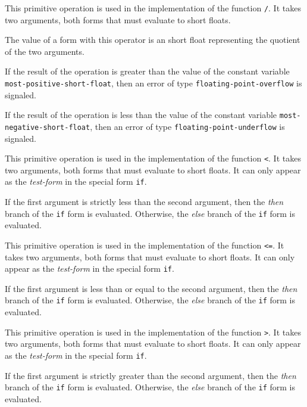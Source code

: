 
This primitive operation is used in the implementation of the
\commonlisp{} function \texttt{/}.  It takes two arguments, both forms
that must evaluate to short floats.

The value of a form with this operator is an short float
representing the quotient of the two arguments.

If the result of the operation is greater than the value of the
constant variable \texttt{most-positive-short-float}, then an error of
type \texttt{floating-point-overflow} is signaled.

If the result of the operation is less than the value of the constant
variable \texttt{most-negative-short-float}, then an error of type
\texttt{floating-point-underflow} is signaled.


This primitive operation is used in the implementation of the
\commonlisp{} function \texttt{<}.  It takes two arguments, both forms
that must evaluate to short floats.  It can only appear as the
\emph{test-form} in the special form \texttt{if}.

If the first argument is strictly less than the second argument, then
the \emph{then} branch of the \texttt{if} form is evaluated.
Otherwise, the \emph{else} branch of the \texttt{if} form is
evaluated.


This primitive operation is used in the implementation of the
\commonlisp{} function \texttt{<=}.  It takes two arguments, both forms
that must evaluate to short floats.  It can only appear as the
\emph{test-form} in the special form \texttt{if}.

If the first argument is less than or equal to the second argument,
then the \emph{then} branch of the \texttt{if} form is evaluated.
Otherwise, the \emph{else} branch of the \texttt{if} form is
evaluated.


This primitive operation is used in the implementation of the
\commonlisp{} function \texttt{>}.  It takes two arguments, both forms
that must evaluate to short floats.  It can only appear as the
\emph{test-form} in the special form \texttt{if}.

If the first argument is strictly greater than the second argument,
then the \emph{then} branch of the \texttt{if} form is evaluated.
Otherwise, the \emph{else} branch of the \texttt{if} form is
evaluated.

